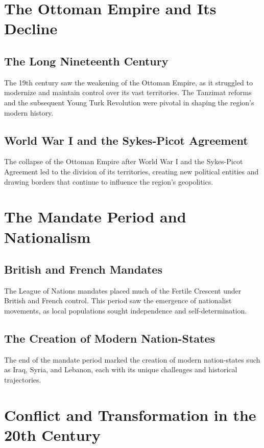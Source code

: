 \documentclass[a4paper,12pt]{book}
\begin{document}
\section{The Ottoman Empire and Its Decline}
\label{sec:ottoman-empire}

\subsection{The Long Nineteenth Century}
The 19th century saw the weakening of the Ottoman Empire, as it struggled to modernize and maintain control over its vast territories. The Tanzimat reforms and the subsequent Young Turk Revolution were pivotal in shaping the region's modern history.

\subsection{World War I and the Sykes-Picot Agreement}
The collapse of the Ottoman Empire after World War I and the Sykes-Picot Agreement led to the division of its territories, creating new political entities and drawing borders that continue to influence the region's geopolitics.

\section{The Mandate Period and Nationalism}
\label{sec:mandate-nationalism}

\subsection{British and French Mandates}
The League of Nations mandates placed much of the Fertile Crescent under British and French control. This period saw the emergence of nationalist movements, as local populations sought independence and self-determination.

\subsection{The Creation of Modern Nation-States}
The end of the mandate period marked the creation of modern nation-states such as Iraq, Syria, and Lebanon, each with its unique challenges and historical trajectories.

\section{Conflict and Transformation in the 20th Century}
\label{sec:conflict-transformation}
\end{document}
